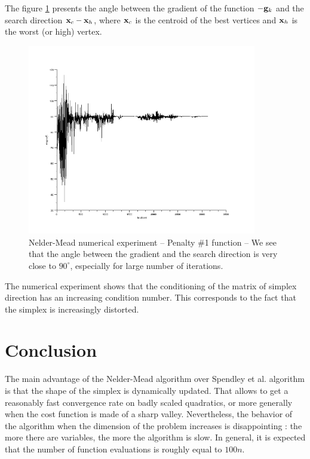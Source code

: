 The figure \ref{fig-nm-numexp-torczon1} presents the 
angle between the gradient of the function $-\mathbf{g}_k$ and the search 
direction $\mathbf{x}_c - \mathbf{x}_h$, where $\mathbf{x}_c$ is the centroid of the best 
vertices and $\mathbf{x}_h$ is the worst (or high) vertex.

\begin{figure}
\begin{center}
\includegraphics[width=10cm]{torczon_test1_angle.png}
\end{center}
\caption{Nelder-Mead numerical experiment -- Penalty \#1 function --
We see that the angle between the gradient and the search direction
is very close to $90^{\circ}$, especially for large number of iterations.}
\label{fig-nm-numexp-torczon1}
\end{figure}

The numerical experiment shows that the conditioning of the matrix 
of simplex direction has an increasing condition number. This corresponds to the 
fact that the simplex is increasingly distorted.

\section{Conclusion}

The main advantage of the Nelder-Mead algorithm over Spendley et al.
algorithm is that the shape of the simplex is dynamically updated.
That allows to get a reasonably fast convergence rate on badly scaled
quadratics, or more generally when the cost function is made 
of a sharp valley. Nevertheless, the behavior of the algorithm when the 
dimension of the problem increases is disappointing : the more there are 
variables, the more the algorithm is slow. In general, it is expected 
that the number of function evaluations is roughly equal to $100n$.


